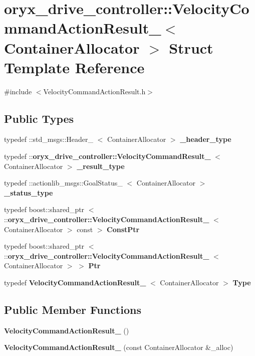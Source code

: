 \section{oryx\-\_\-drive\-\_\-controller\-:\-:\-Velocity\-Command\-Action\-Result\-\_\-$<$ \-Container\-Allocator $>$ \-Struct \-Template \-Reference}
\label{structoryx__drive__controller_1_1VelocityCommandActionResult__}


{\ttfamily \#include $<$\-Velocity\-Command\-Action\-Result.\-h$>$}

\subsection*{\-Public \-Types}
\begin{DoxyCompactItemize}
\item 
typedef \-::std\-\_\-msgs\-::\-Header\-\_\-\*
$<$ \-Container\-Allocator $>$ {\bf \-\_\-header\-\_\-type}
\item 
typedef \*
\-::{\bf oryx\-\_\-drive\-\_\-controller\-::\-Velocity\-Command\-Result\-\_\-}\*
$<$ \-Container\-Allocator $>$ {\bf \-\_\-result\-\_\-type}
\item 
typedef \*
\-::actionlib\-\_\-msgs\-::\-Goal\-Status\-\_\-\*
$<$ \-Container\-Allocator $>$ {\bf \-\_\-status\-\_\-type}
\item 
typedef boost\-::shared\-\_\-ptr\*
$<$ \-::{\bf oryx\-\_\-drive\-\_\-controller\-::\-Velocity\-Command\-Action\-Result\-\_\-}\*
$<$ \-Container\-Allocator $>$ const  $>$ {\bf \-Const\-Ptr}
\item 
typedef boost\-::shared\-\_\-ptr\*
$<$ \-::{\bf oryx\-\_\-drive\-\_\-controller\-::\-Velocity\-Command\-Action\-Result\-\_\-}\*
$<$ \-Container\-Allocator $>$ $>$ {\bf \-Ptr}
\item 
typedef \*
{\bf \-Velocity\-Command\-Action\-Result\-\_\-}\*
$<$ \-Container\-Allocator $>$ {\bf \-Type}
\end{DoxyCompactItemize}
\subsection*{\-Public \-Member \-Functions}
\begin{DoxyCompactItemize}
\item 
{\bf \-Velocity\-Command\-Action\-Result\-\_\-} ()
\item 
{\bf \-Velocity\-Command\-Action\-Result\-\_\-} (const \-Container\-Allocator \&\-\_\-alloc)
\end{DoxyCompactItemize}
